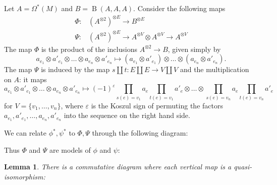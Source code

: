 \documentclass{scrartcl}
\theoremstyle{plain}
\newtheorem{lemma}[theorem]{Lemma}
\theoremstyle{definition}
\renewcommand{\epsilon}{\varepsilon}
\DeclareMathOperator{\Map}{Map}
\DeclareMathOperator{\BC}{B}
\renewcommand{\coprod}{\mathbin{\amalg}}
\newcommand{\Prod}{\prod}
\begin{document}
Let $A=\Omega^*(M)$ and $B = \BC(A, A, A)$. Consider the following maps
\begin{align*}
    \Phi\colon& (A^{\otimes 2})^{\otimes E}\to B^{\otimes E} \\
    \Psi\colon& (A^{\otimes 2})^{\otimes E} \to A^{\otimes V}\otimes A^{\otimes V}\to A^{\otimes V} 
\end{align*}
The map $\Phi$ is the product of the inclusions $A^{\otimes 2}\to B$, given simply by
$$a_{e_1}\otimes a'_{e_1}\otimes\dots\otimes a_{e_n}\otimes a'_{e_n} \mapsto (a_{e_1}\otimes a'_{e_1}) \otimes \dots\otimes (a_{e_n}\otimes a'_{e_n}).$$ 
The map $\Psi$ is induced by the map $s\coprod t\colon E\coprod E\to V\coprod V$ and the multiplication on $A$: it maps 
$$a_{e_1}\otimes a'_{e_1}\otimes\dots\otimes a_{e_n}\otimes a'_{e_n} \mapsto (-1)^\epsilon \Prod_{s(e) = v_1}a_e \Prod_{t(e) = v_1} a'_e \otimes \dots\otimes \Prod_{s(e) = v_n}a_e \Prod_{t(e) = v_n} a'_e$$
for $V = \{v_1,\dots, v_n\}$, where $\epsilon$ is the Koszul sign of permuting the factors $a_{e_1}, a'_{e_1}, \dots, a_{e_n}, a'_{e_n}$ into the sequence on the right hand side. 

We can relate $\phi^*, \psi^*$ to $\Phi, \Psi$ through the following diagram: 
\begin{center}
\end{center}

Thus $\Phi$ and $\Psi$ are models of $\phi$ and $\psi$:
\begin{lemma}\label{lem:graph-model-aid}
    There is a commutative diagram where each vertical map is a quasi-isomorphism:
    \begin{center}
    \end{center}
\end{lemma}
\end{document}
